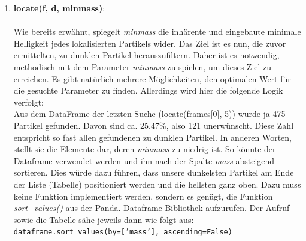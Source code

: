 \begin{enumerate}
    			
    			\item \textbf{locate(f, d, minmass)}:\\ \\
Wie bereits erwähnt, spiegelt \textit{minmass} die inhärente und eingebaute minimale Helligkeit jedes lokalisierten Partikels wider. Das Ziel ist es nun, die zuvor ermittelten, zu dunklen Partikel herauszufiltern. Daher ist es notwendig, methodisch mit dem Parameter \textit{minmass} zu spielen, um dieses Ziel zu erreichen. Es gibt natürlich mehrere Möglichkeiten, den optimalen Wert für die gesuchte Parameter zu finden. Allerdings wird hier die folgende Logik verfolgt:\\

Aus dem DataFrame der letzten Suche (locate(frames[0], 5)) wurde ja 475 Partikel gefunden. Davon sind ca. 25.47\%, also 121 unerwünscht. Diese Zahl entspricht so fast allen gefundenen zu dunklen Partikel. In anderen Worten, stellt sie die Elemente dar, deren \textit{minmass} zu niedrig ist.
So könnte der Dataframe verwendet werden und ihn nach der Spalte \textit{mass} absteigend sortieren. 
Dies würde dazu führen, dass unsere dunkelsten Partikel am Ende der Liste (Tabelle) positioniert werden und die hellsten ganz oben. Dazu muss keine Funktion implementiert werden, sondern es genügt, die Funktion \textit{sort\_values()} aus der Panda. Dataframe-Bibliothek aufzurufen. Der Aufruf sowie die Tabelle sähe jeweils dann wie folgt aus:\\ \texttt{dataframe.sort\_values(by=['mass'], ascending=False)}


\end{enumerate}
